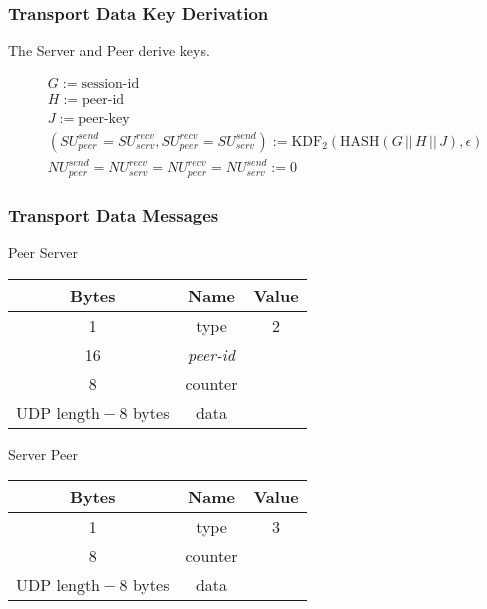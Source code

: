 \subsubsection{Transport Data Key Derivation}

The Server and Peer derive keys.

\begin{align*}
    &  G:= \text{session-id}                                                               \\
    &  H := \text{peer-id}                                                                \\
    &  J := \text{peer-key}                                                              \\
    &  (\mathit{SU}_{peer}^{send} = \mathit{SU}_{serv}^{recv}, \mathit{SU}_{peer}^{recv} = \mathit{SU}_{serv}^{send}) := \text{KDF}_2(\text{HASH}(G\,
    ||\, H\,||\, J), \epsilon)                                        \\
    &   \mathit{NU}_{peer}^{send} = \mathit{NU}_{serv}^{recv} = \mathit{NU}_{peer}^{recv} = \mathit{NU}_{serv}^{send} := 0
\end{align*}

\subsubsection{Transport Data Messages}

\begin{center}
    Peer \textrightarrow Server\\
    \begin{tabular}{|c|c|c|}
        \hline
        \textbf{Bytes}                & \textbf{Name}  & \textbf{Value} \\
        \hline
        1                             & type           & 2              \\
        \hline
        16                            & \emph{peer-id} &                \\
        \hline
        8                             & counter        &                \\
        \hline
        $\text{UDP length} - 8$ bytes & data           &                \\
        \hline
    \end{tabular}
\end{center}

\begin{center}
    Server \textrightarrow Peer\\
    \begin{tabular}{|c|c|c|}
        \hline
        \textbf{Bytes}                & \textbf{Name} & \textbf{Value} \\
        \hline
        1                             & type          & 3              \\
        \hline
        8                             & counter       &                \\
        \hline
        $\text{UDP length} - 8$ bytes & data          &                \\
        \hline
    \end{tabular}
\end{center}


